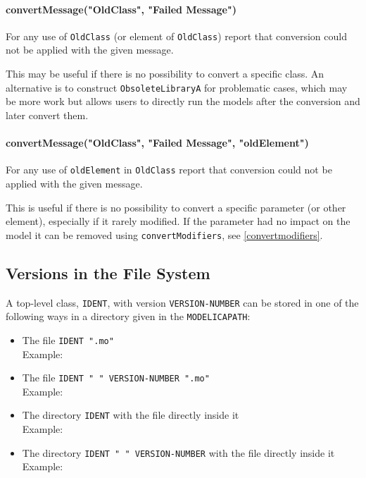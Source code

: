 \paragraph*{convertMessage("OldClass", "Failed Message")}\label{convertmessageoldclass-failed-message}

For any use of \lstinline!OldClass! (or element of \lstinline!OldClass!) report that conversion could not be applied with the given message.

\begin{nonnormative}
This may be useful if there is no possibility to convert a specific class.
An alternative is to construct \lstinline!ObsoleteLibraryA! for problematic cases, which may be more work but allows users to directly run the models after the conversion and later convert them.
\end{nonnormative}

\paragraph*{convertMessage("OldClass", "Failed Message", "oldElement")}\label{convertmessageoldclass-failed-message2}

For any use of \lstinline!oldElement! in \lstinline!OldClass! report that conversion could not be applied with the given message.

\begin{nonnormative}
This is useful if there is no possibility to convert a specific parameter (or other element), especially if it rarely modified.
If the parameter had no impact on the model it can be removed using \lstinline!convertModifiers!, see \cref{convertmodifiers}.
\end{nonnormative}

\subsection{Versions in the File System}\label{mapping-of-versions-to-file-system}\label{versions-in-the-File-System}

A top-level class, \lstinline!IDENT!, with version \lstinline!VERSION-NUMBER! can be stored in one of the following ways in a directory given in the \lstinline!MODELICAPATH!:
\begin{itemize}
\item
  The file \lstinline!IDENT ".mo"!\\
  Example: 
\item
  The file \lstinline!IDENT " " VERSION-NUMBER ".mo"!\\
  Example: 
\item
  The directory \lstinline!IDENT! with the file  directly inside it\\
  Example: 
\item
  The directory \lstinline!IDENT " " VERSION-NUMBER! with the file  directly inside it\\
  Example: 
\end{itemize}

